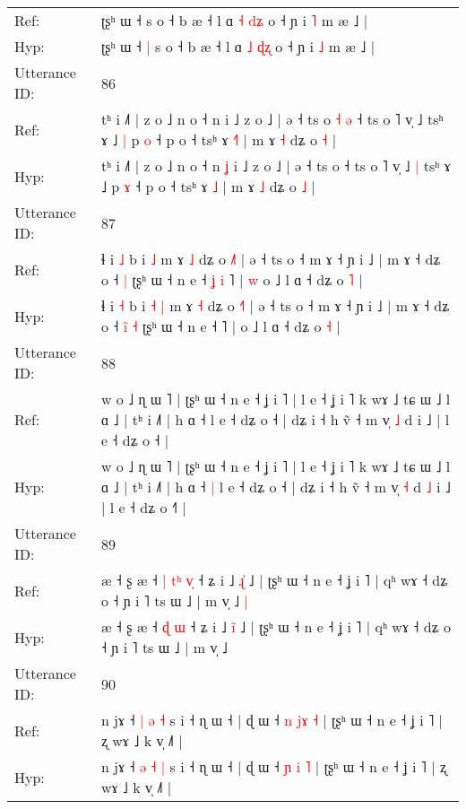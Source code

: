 \documentclass[10pt]{article}
\DeclareRobustCommand{\hl}[1]{{\textcolor{red}{#1}}}
\begin{document}
\begin{longtable}{ll}
Ref: & ʈʂʰ ɯ ˧\hl{}\hl{} s o ˧ b æ ˧ l ɑ \hl{˧} \hl{d}\hl{ʑ} o ˧ ɲ i \hl{˥} m æ ˩ |
 \\
Hyp: & ʈʂʰ ɯ ˧\hl{ }\hl{|} s o ˧ b æ ˧ l ɑ \hl{˩} \hl{ɖ}\hl{ʐ} o ˧ ɲ i \hl{˩} m æ ˩ |
 \\
\midrule
Utterance ID: & 86 \\
Ref: & tʰ i ˩˥ | z o ˩ n o ˧ n\hl{}\hl{} i ˩ z o ˩ | ə ˧ ts o\hl{ }\hl{˧}\hl{ }\hl{ə} ˧ ts o ˥ v̩ ˩\hl{}\hl{} tsʰ ɤ ˩\hl{ }\hl{|} p \hl{o} ˧ p o ˧ tsʰ ɤ \hl{˧}\hl{˥} | m ɤ \hl{˧} dʑ o \hl{˧} |
 \\
Hyp: & tʰ i ˩˥ | z o ˩ n o ˧ n\hl{ }\hl{ʝ} i ˩ z o ˩ | ə ˧ ts o\hl{}\hl{}\hl{}\hl{} ˧ ts o ˥ v̩ ˩\hl{ }\hl{|} tsʰ ɤ ˩\hl{}\hl{} p \hl{ɤ} ˧ p o ˧ tsʰ ɤ \hl{}\hl{˩} | m ɤ \hl{˩} dʑ o \hl{˩} |
 \\
\midrule
Utterance ID: & 87 \\
Ref: & ɬ i \hl{˩} b i\hl{}\hl{} \hl{˩} m ɤ \hl{˩} dʑ o \hl{˩}˥ | ə ˧ ts o ˧ m ɤ ˧ ɲ i ˩ | m ɤ ˧ dʑ o ˧\hl{}\hl{}\hl{} \hl{|} ʈʂʰ ɯ ˧ n e ˧\hl{ }\hl{ʝ}\hl{ }\hl{i} ˥ |\hl{ }\hl{w} o ˩ l ɑ ˧ dʑ o \hl{˥} |
 \\
Hyp: & ɬ i \hl{˧} b i\hl{ }\hl{˧} \hl{|} m ɤ \hl{˧} dʑ o \hl{˧}˥ | ə ˧ ts o ˧ m ɤ ˧ ɲ i ˩ | m ɤ ˧ dʑ o ˧\hl{ }\hl{i}\hl{̃} \hl{˧} ʈʂʰ ɯ ˧ n e ˧\hl{}\hl{}\hl{}\hl{} ˥ |\hl{}\hl{} o ˩ l ɑ ˧ dʑ o \hl{˧} |
 \\
\midrule
Utterance ID: & 88 \\
Ref: & w o ˩ ɳ ɯ ˥ | ʈʂʰ ɯ ˧ n e ˧ ʝ i ˥ | l e ˧ ʝ i ˥ k wɤ ˩ tɕ ɯ ˩ l ɑ ˩ | tʰ i ˩˥ | h ɑ ˧\hl{}\hl{} l e ˧ dʑ o ˧ | dʑ i ˧ h ṽ ˧ m v̩ \hl{˩} d\hl{}\hl{} i ˩ | l e ˧ dʑ o ˧\hl{} |
 \\
Hyp: & w o ˩ ɳ ɯ ˥ | ʈʂʰ ɯ ˧ n e ˧ ʝ i ˥ | l e ˧ ʝ i ˥ k wɤ ˩ tɕ ɯ ˩ l ɑ ˩ | tʰ i ˩˥ | h ɑ ˧\hl{ }\hl{|} l e ˧ dʑ o ˧ | dʑ i ˧ h ṽ ˧ m v̩ \hl{˧} d\hl{ }\hl{˩} i ˩ | l e ˧ dʑ o ˧\hl{˥} |
 \\
\midrule
Utterance ID: & 89 \\
Ref: & æ ˧ ʂ æ ˧\hl{ }\hl{|} \hl{t}\hl{ʰ} \hl{v}\hl{̩} ˧ ʑ i ˩ \hl{ɻ}\hl{̍} ˩ | ʈʂʰ ɯ ˧ n e ˧ ʝ i ˥ | qʰ wɤ ˧ dʑ o ˧ ɲ i ˥ ts ɯ ˩ | m v̩ ˩\hl{ }\hl{|}
 \\
Hyp: & æ ˧ ʂ æ ˧\hl{}\hl{} \hl{}\hl{ɖ} \hl{}\hl{ɯ} ˧ ʑ i ˩ \hl{i}\hl{̃} ˩ | ʈʂʰ ɯ ˧ n e ˧ ʝ i ˥ | qʰ wɤ ˧ dʑ o ˧ ɲ i ˥ ts ɯ ˩ | m v̩ ˩\hl{}\hl{}
 \\
\midrule
Utterance ID: & 90 \\
Ref: & n jɤ ˧ \hl{|} \hl{ə} \hl{˧} s i ˧ ɳ ɯ ˧ | ɖ ɯ ˧ \hl{n} \hl{j}\hl{ɤ} \hl{˧} | ʈʂʰ ɯ ˧ n e ˧ ʝ i ˥ | ʐ wɤ ˩ k v̩ ˩˥ |
 \\
Hyp: & n jɤ ˧ \hl{ə} \hl{˧} \hl{|} s i ˧ ɳ ɯ ˧ | ɖ ɯ ˧ \hl{ɲ} \hl{}\hl{i} \hl{˥} | ʈʂʰ ɯ ˧ n e ˧ ʝ i ˥ | ʐ wɤ ˩ k v̩ ˩˥ |

\end{longtable}
\end{document}
